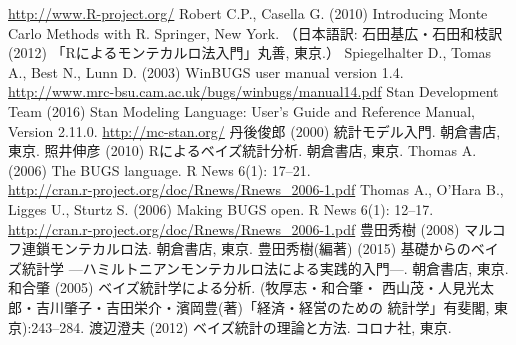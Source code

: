 \documentclass[11pt,uplatex]{jsarticle}
\begin{document}
\begin{thebibliography}{99}
   \url{http://www.R-project.org/}
 Robert C.P., Casella G. (2010) Introducing Monte Carlo Methods with R.
  Springer, New York.
  （日本語訳: 石田基広・石田和枝訳 (2012) 「Rによるモンテカルロ法入門」丸善, 東京.）
 Spiegelhalter D., Tomas A., Best N., Lunn D. (2003)
  WinBUGS user manual version 1.4.\\
  \url{http://www.mrc-bsu.cam.ac.uk/bugs/winbugs/manual14.pdf}
 Stan Development Team (2016) Stan Modeling Language:
  User's Guide and Reference Manual, Version 2.11.0.
  \url{http://mc-stan.org/}
 丹後俊郎 (2000) 統計モデル入門. 朝倉書店, 東京.
 照井伸彦 (2010) Rによるベイズ統計分析. 朝倉書店, 東京.
 Thomas A. (2006) The BUGS language.
  R News 6(1): 17--21. \\
  \url{http://cran.r-project.org/doc/Rnews/Rnews_2006-1.pdf}
 Thomas A., O'Hara B., Ligges U., Sturtz S. (2006) Making BUGS open.
  R News 6(1): 12--17. \\
  \url{http://cran.r-project.org/doc/Rnews/Rnews_2006-1.pdf}
 豊田秀樹 (2008) マルコフ連鎖モンテカルロ法. 朝倉書店, 東京.
 豊田秀樹(編著) (2015) 基礎からのベイズ統計学
  ---ハミルトニアンモンテカルロ法による実践的入門---. 朝倉書店, 東京.
 和合肇 (2005) ベイズ統計学による分析. (牧厚志・和合肇・
  西山茂・人見光太郎・吉川肇子・吉田栄介・濱岡豊(著)「経済・経営のための
  統計学」有斐閣, 東京):243--284.
 渡辺澄夫 (2012) ベイズ統計の理論と方法. コロナ社, 東京.
\end{thebibliography}
\end{document}
